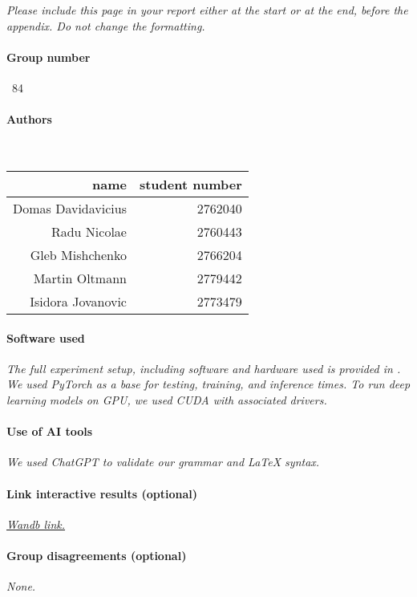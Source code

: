 \noindent \textit{Please include this page in your report either at the start or at the end, before the appendix. Do not change the formatting.}

\paragraph{Group number}~84

\vspace{0.3cm}

\paragraph{Authors}~

\vspace{0.3cm}

\begin{tabular}{r r}
name &student number \\
\hline
Domas Davidavicius & 2762040 \\
Radu Nicolae & 2760443 \\
Gleb Mishchenko & 2766204  \\
Martin Oltmann & 2779442 \\
Isidora Jovanovic &  2773479\\
\end{tabular}

\vspace{0.3cm}

\paragraph{Software used} \textit{The full experiment setup, including software and hardware used is provided in . We used PyTorch as a base for testing, training, and inference times. To run deep learning models on GPU, we used CUDA with associated drivers.}

\vspace{0.3cm}

\paragraph{Use of AI tools} \textit{We used ChatGPT to validate our grammar and LaTeX syntax.}

\vspace{0.3cm}

\paragraph{Link interactive results (optional)} 
\textit{\href{https://wandb.ai/fzovpec/ml_project}{Wandb link.}}

\vspace{0.3cm}

\paragraph{Group disagreements (optional)} \textit{None.}
